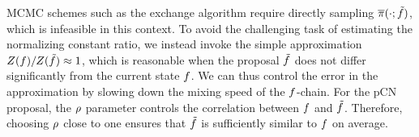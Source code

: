 \documentclass[12pt]{article}
\begin{document}
MCMC schemes such as the exchange algorithm \citep{exchangeAlg} require 
directly sampling $\overline{\pi}(\cdot; \tilde{f})$,
which is infeasible in this context. To avoid the challenging task of estimating the 
normalizing constant ratio, we instead invoke the simple approximation 
$Z(f)/Z(\tilde{f}) \approx 1$, which is reasonable when 
the proposal $\tilde{f}$ does not differ significantly from the current
state $f$. We can thus control the error in the approximation by slowing
down the mixing speed of the $f$-chain. For the pCN proposal,
the $\rho$ parameter controls the correlation between $f$ and 
$\tilde{f}$. Therefore, choosing $\rho$ close to one ensures that
$\tilde{f}$ is sufficiently similar to $f$ on average. 
\end{document}
